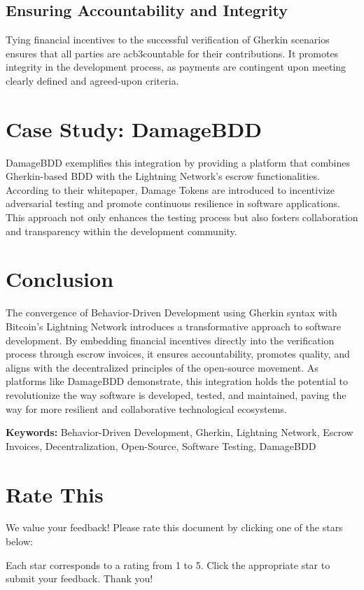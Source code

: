 \documentclass[12pt]{article}
\begin{document}
\subsection*{Ensuring Accountability and Integrity}
Tying financial incentives to the successful verification of Gherkin scenarios ensures that all parties are acb3countable for their contributions. It promotes integrity in the development process, as payments are contingent upon meeting clearly defined and agreed-upon criteria.

\section*{Case Study: DamageBDD}
DamageBDD exemplifies this integration by providing a platform that combines Gherkin-based BDD with the Lightning Network's escrow functionalities. According to their whitepaper, Damage Tokens are introduced to incentivize adversarial testing and promote continuous resilience in software applications. This approach not only enhances the testing process but also fosters collaboration and transparency within the development community.

\section*{Conclusion}
The convergence of Behavior-Driven Development using Gherkin syntax with Bitcoin's Lightning Network introduces a transformative approach to software development. By embedding financial incentives directly into the verification process through escrow invoices, it ensures accountability, promotes quality, and aligns with the decentralized principles of the open-source movement. As platforms like DamageBDD demonstrate, this integration holds the potential to revolutionize the way software is developed, tested, and maintained, paving the way for more resilient and collaborative technological ecosystems.

\vfill
\noindent
\textbf{Keywords:} Behavior-Driven Development, Gherkin, Lightning Network, Escrow Invoices, Decentralization, Open-Source, Software Testing, DamageBDD


\section*{Rate This}

We value your feedback! Please rate this document by clicking one of the stars below:

\bigskip

\noindent
\href{https://example.com/rate-this?rating=1}{\textbf{}}%
\href{https://example.com/rate-this?rating=2}{\textbf{}}%
\href{https://example.com/rate-this?rating=3}{\textbf{}}%
\href{https://example.com/rate-this?rating=4}{\textbf{}}%
\href{https://example.com/rate-this?rating=5}{\textbf{}}

\bigskip

Each star corresponds to a rating from 1 to 5. Click the appropriate star to submit your feedback. Thank you!
\end{document}
